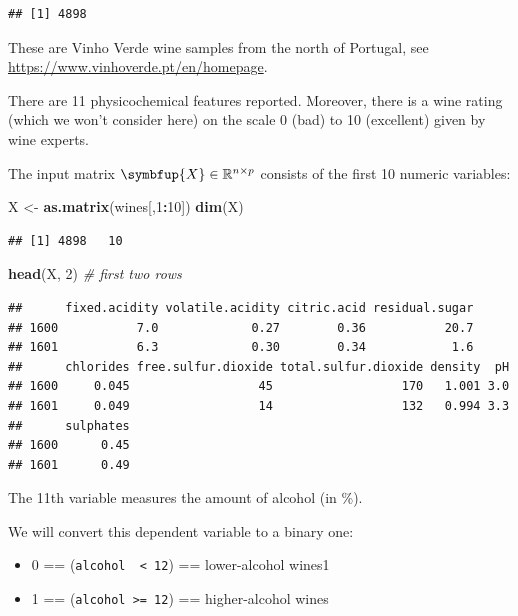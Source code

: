 \documentclass[10pt,b5paper,krantz1]{krantz}
\newenvironment{Shaded}{\begin{snugshade}}{\end{snugshade}}
\newcommand{\CommentTok}[1]{\textcolor[rgb]{0.37,0.37,0.37}{\textit{#1}}}
\newcommand{\DecValTok}[1]{\textcolor[rgb]{0.06,0.06,0.06}{#1}}
\newcommand{\KeywordTok}[1]{\textcolor[rgb]{0.27,0.27,0.27}{\textbf{#1}}}
\newcommand{\NormalTok}[1]{#1}
\newcommand{\OperatorTok}[1]{\textcolor[rgb]{0.43,0.43,0.43}{\textbf{#1}}}
\newcommand{\StringTok}[1]{\textcolor[rgb]{0.5,0.5,0.5}{#1}}
\providecommand{\tightlist}{%
  \setlength{\itemsep}{0pt}\setlength{\parskip}{0pt}}
\renewcommand{\mathbf}[1]{\symbfup{#1}}
\begin{document}
\begin{verbatim}
## [1] 4898
\end{verbatim}

These are Vinho Verde wine samples from the north of Portugal,
see \url{https://www.vinhoverde.pt/en/homepage}.

There are 11 physicochemical features reported.
Moreover, there is a wine rating (which we won't consider here)
on the scale 0 (bad) to 10 (excellent)
given by wine experts.

The input matrix \(\mathbf{X}\in\mathbb{R}^{n\times p}\)
consists of the first 10 numeric variables:

\begin{Shaded}
\begin{Highlighting}[]
\NormalTok{X <-}\StringTok{ }\KeywordTok{as.matrix}\NormalTok{(wines[,}\DecValTok{1}\OperatorTok{:}\DecValTok{10}\NormalTok{])}
\KeywordTok{dim}\NormalTok{(X)}
\end{Highlighting}
\end{Shaded}

\begin{verbatim}
## [1] 4898   10
\end{verbatim}

\begin{Shaded}
\begin{Highlighting}[]
\KeywordTok{head}\NormalTok{(X, }\DecValTok{2}\NormalTok{) }\CommentTok{# first two rows}
\end{Highlighting}
\end{Shaded}

\begin{verbatim}
##      fixed.acidity volatile.acidity citric.acid residual.sugar
## 1600           7.0             0.27        0.36           20.7
## 1601           6.3             0.30        0.34            1.6
##      chlorides free.sulfur.dioxide total.sulfur.dioxide density  pH
## 1600     0.045                  45                  170   1.001 3.0
## 1601     0.049                  14                  132   0.994 3.3
##      sulphates
## 1600      0.45
## 1601      0.49
\end{verbatim}

The 11th variable measures the amount of alcohol (in \%).

We will convert this dependent variable to a binary one:

\begin{itemize}
\tightlist
\item
  0 == (\texttt{alcohol\ \ \textless{}\ 12}) == lower-alcohol wines1
\item
  1 == (\texttt{alcohol\ \textgreater{}=\ 12}) == higher-alcohol wines
\end{itemize}
\end{document}
